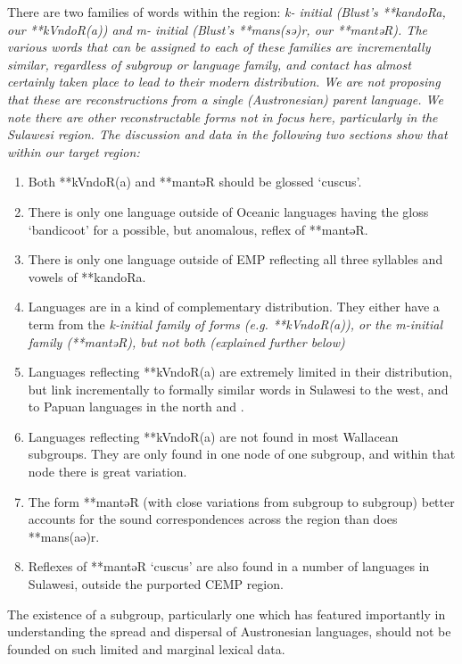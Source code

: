 There are two families of words within the region: \it{k-} initial
(Blust’s **kandoRa, our **kVndoR(a)) and \it{m-} initial (Blust’s **mans(sə)r, our **mantəR).
The various words that can be assigned to each of these families
are incrementally similar, regardless of subgroup or language family,
and contact has almost certainly taken place to lead to their modern distribution.
We are not proposing that these are reconstructions from a single (Austronesian) parent language.
We note there are other reconstructable forms not in focus here,
particularly in the Sulawesi region.
The discussion and data in the following two sections show that
within our target region:

\newpage
\begin{enumerate}
	\item	Both **kVndoR(a)
				and **mantəR should be glossed ‘cuscus’.
	\item	There is only one language outside of Oceanic languages
				having the gloss ‘bandicoot’ for a possible,
				but anomalous, reflex of **mantəR.
	\item	There is only one language outside of EMP reflecting all
				three syllables and vowels of **kandoRa.
	\item	Languages are in a kind of complementary distribution. They either
				have a term from the \it{k-}initial family of forms (e.g.
				**kVndoR(a)), or the \it{m-}initial family (**mantəR),
				but not both (explained further below)
	\item	Languages reflecting **kVndoR(a) are extremely limited
				in their distribution, but link incrementally to formally similar words in Sulawesi
				to the west, and to Papuan languages in the north and .
	\item	Languages reflecting **kVndoR(a) are not found in most Wallacean subgroups.
				They are only found in one node of one subgroup,
				and within that node there is great variation.
	\item	The form **mantəR (with close variations from subgroup
				to subgroup) better accounts for the sound correspondences across
				the region than does **mans(aə)r.
	\item	Reflexes of **mantəR ‘cuscus’ are also found in a number
				of languages in Sulawesi,
				outside the purported CEMP region.
\end{enumerate}

The existence of a subgroup,
particularly one which has featured importantly in understanding
the spread and dispersal of Austronesian languages,
should not be founded on such limited
and marginal lexical data.

